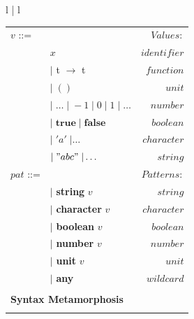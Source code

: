 \documentclass[11pt]{article}
\begin{document}
\begin{figure}[h]
\begin{tabular}[t]{l | l}
\begin{tabular}[t]{l l r}
			\; $v$ ::=      &                                                                     & $Values:$     \\
			                & $x$                                                                 & $identifier$  \\
			                & $|$ t $\to$ t                                                       & $function$    \\
			                & $| \; () $                                                          & $unit$        \\
			                & $| \; \ldots \; | \; -1 \; | \;  0 \;  |  \; 1  \; | \; \ldots$     & $number$      \\
			                & $| \; \textbf{true} \; | \; \textbf{false} $                        & $boolean$     \\
			                & $| \;  'a'  \; | \ldots $                                           & $character$   \\
			                & $| \; "abc"  \; | \dots $                                           & $string$      \\
			\; $pat$ ::=    &                                                                     & $Patterns:$   \\
			                & $|$ \textbf{string} $v$                                             & $string$      \\
			                & $|$ \textbf{character} $v$                                          & $character$   \\
			                & $|$ \textbf{boolean} $v$                                            & $boolean$     \\
			                & $|$ \textbf{number} $v$                                             & $number$      \\
			                & $|$ \textbf{unit} $v$                                               & $unit$        \\
			                & $|$ \textbf{any}                                                    & $wildcard$    \\
			                &                                                                     &               \\
			\multicolumn{3}{l}{\textbf{Syntax Metamorphosis}}                                                     \\
			\multicolumn{3}{r}{\framebox{$term \to block$}}                                                       \\

\end{tabular}
\end{tabular}
\end{figure}
\end{document}

